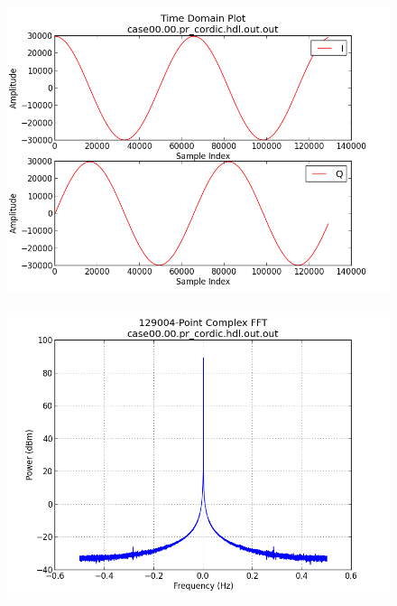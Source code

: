 \documentclass{article}
\begin{document}
	\begin{figure}[ht]
		\centering
		\begin{minipage}{.5\textwidth}
			\centering\includegraphics[width=1.0\linewidth]{output_time}
			\label{fig:output_time}
		\end{minipage}%
		\begin{minipage}{.5\textwidth}
			\centering\includegraphics[width=1.0\linewidth]{output_freq}
			\label{fig:output_freq}
		\end{minipage}
	\end{figure}
\end{document}
